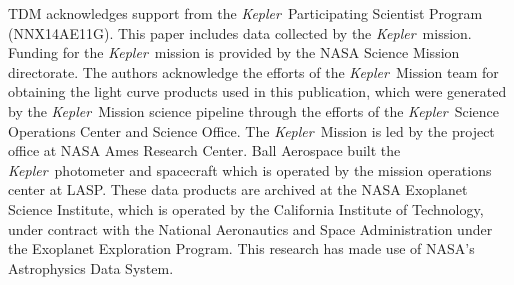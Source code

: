 \documentclass{emulateapj}
\newcommand{\kepler}{\textit{Kepler}}
\begin{document}
\acknowledgments TDM acknowledges support from the \kepler\
Participating Scientist Program (NNX14AE11G). This paper includes data
collected by the \kepler\ mission. Funding for the \kepler\ mission
is provided by the NASA Science Mission directorate. The authors
acknowledge the efforts of the \kepler\ Mission team for obtaining
the light curve products used in
this publication, which were generated by the \kepler\ Mission
science pipeline through the efforts of the \kepler\ Science
Operations Center and Science Office. The \kepler\ Mission is led by
the project office at NASA Ames Research Center. Ball Aerospace built
the \kepler\ photometer and spacecraft which is operated by the
mission operations center at LASP. These data products are archived at
the NASA Exoplanet Science Institute, which is operated by the
California Institute of Technology, under contract with the National
Aeronautics and Space Administration under the Exoplanet Exploration
Program. This research has made use of NASA's Astrophysics Data
System. 

\clearpage

\clearpage
\end{document}
